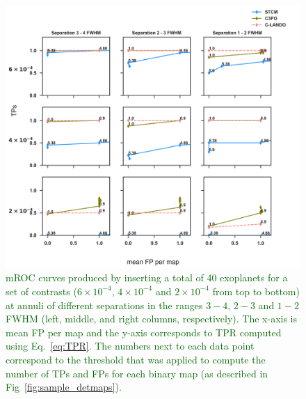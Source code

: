 \documentclass{aa}
\newcommand{\newchange}[1]{\textcolor{darkgreen}{#1}}
\begin{document}
\begin{figure}
\centering
    \includegraphics[width=1.0\textwidth]{fig4_March2024_referee.png}
\caption{ \newchange{mROC curves produced by inserting a total of 40 exoplanets for a set of contrasts ($6 \times 10^{-4}$, $4 \times 10^{-4}$ and $2 \times 10^{-4}$ from top to bottom) at annuli of different separations in the ranges $3-4$, $2-3$ and $1-2$ FWHM (left, middle, and right columns, respectively).
The x-axis is mean FP per map and the y-axis corresponds to TPR computed using Eq.~\ref{eq:TPR}. 
The numbers next to each data point correspond to the threshold that was applied to compute the number of TPs and FPs for each binary map (as described in Fig~\ref{fig:sample_detmaps}).
}}
    \label{fig:fig_4}
\end{figure}
\end{document}
